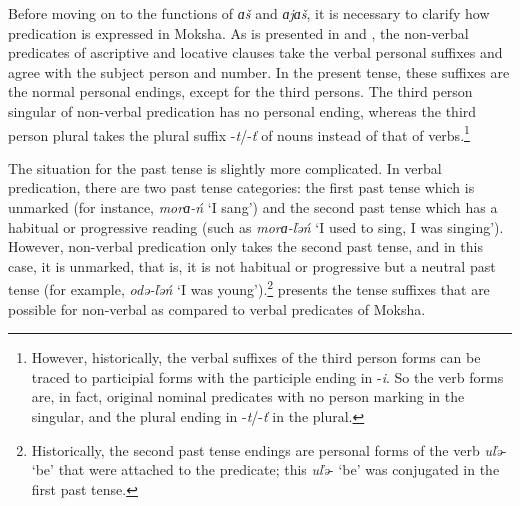 \documentclass[output=paper]{langsci/langscibook}
\begin{document}
  Before moving on to the functions of \textit{ɑš} and \textit{ɑjɑš}, it is necessary to clarify how predication is expressed in Moksha. As is presented in  and , the non-verbal predicates of ascriptive and locative clauses take the verbal personal suffixes and agree with the subject person and number. In the present tense, these suffixes are the normal personal endings, except for the third persons. The third person singular of non-verbal predication has no personal ending, whereas the third person plural takes the plural suffix -\textit{t}/-\textit{ť} of nouns instead of that of verbs.\footnote{However, historically, the verbal suffixes of the third person forms can be traced to participial forms with the participle ending in -\textit{i}. So the verb forms are, in fact, original nominal predicates with no person marking in the singular, and the plural ending in -\textit{t}/-\textit{ť} in the plural.}

  The situation for the past tense is slightly more complicated. In verbal predication, there are two past tense categories: the first past tense which is unmarked (for instance, \textit{morɑ-ń} `I sang') and the second past tense which has a habitual or progressive reading (such as \textit{morɑ-ľəń} `I used to sing, I was singing'). However, non-verbal predication only takes the second past tense, and in this case, it is unmarked, that is, it is not habitual or progressive but a neutral past tense (for example, \textit{odə-ľəń} `I was young').\footnote{Historically, the second past tense endings are personal forms of the verb \textit{uľə}- `be' that were attached to the predicate; this \textit{uľə}- `be' was conjugated in the first past tense.}  presents the tense suffixes that are possible for non-verbal as compared to verbal predicates of Moksha.
\end{document}
